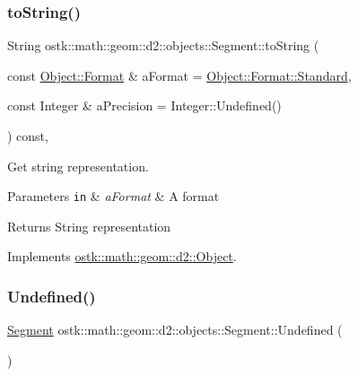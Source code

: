 \subsubsection{\texorpdfstring{to\+String()}{toString()}}
{\footnotesize\ttfamily String ostk\+::math\+::geom\+::d2\+::objects\+::\+Segment\+::to\+String (\begin{DoxyParamCaption}\item[{const \hyperlink{classostk_1_1math_1_1geom_1_1d2_1_1_object_aa76f9e30caebf4005bafbdff447f66cf}{Object\+::\+Format} \&}]{a\+Format = {\ttfamily \hyperlink{classostk_1_1math_1_1geom_1_1d2_1_1_object_aa76f9e30caebf4005bafbdff447f66cfaeb6d8ae6f20283755b339c0dc273988b}{Object\+::\+Format\+::\+Standard}},  }\item[{const Integer \&}]{a\+Precision = {\ttfamily Integer\+:\+:Undefined()} }\end{DoxyParamCaption}) const\hspace{0.3cm}{\ttfamily [override]}, {\ttfamily [virtual]}}



Get string representation. 


\begin{DoxyParams}[1]{Parameters}
\mbox{\tt in}  & {\em a\+Format} & A format \\
\hline
\end{DoxyParams}
\begin{DoxyReturn}{Returns}
String representation 
\end{DoxyReturn}


Implements \hyperlink{classostk_1_1math_1_1geom_1_1d2_1_1_object_ada4c2187dd24ef02b91b6346191f677c}{ostk\+::math\+::geom\+::d2\+::\+Object}.

\mbox{\label{classostk_1_1math_1_1geom_1_1d2_1_1objects_1_1_segment_a44d3a5817296d96bf82ebbc459055025}} 
\subsubsection{\texorpdfstring{Undefined()}{Undefined()}}
{\footnotesize\ttfamily \hyperlink{classostk_1_1math_1_1geom_1_1d2_1_1objects_1_1_segment}{Segment} ostk\+::math\+::geom\+::d2\+::objects\+::\+Segment\+::\+Undefined (\begin{DoxyParamCaption}{ }\end{DoxyParamCaption})\hspace{0.3cm}{\ttfamily [static]}}



